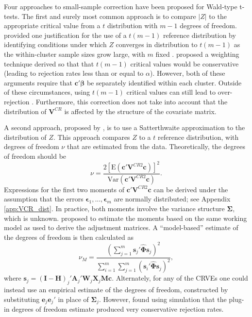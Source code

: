 \documentclass[12pt]{article}\usepackage[]{graphicx}\usepackage[]{color}
\newcommand{\E}{\text{E}}
\newcommand{\Var}{\text{Var}}
\newcommand{\bm}{\mathbf}
\newcommand{\bs}{\boldsymbol}
\begin{document}
Four approaches to small-sample correction have been proposed for Wald-type t-tests. 
The first and surely most common approach is to compare $|Z|$ to the appropriate critical value from a $t$ distribution with $m - 1$ degrees of freedom. 
\citet{Hansen2007asymptotic} provided one justification for the use of a $t(m-1)$ reference distribution by identifying conditions under which $Z$ converges in distribution to $t(m-1)$ as the within-cluster sample sizes grow large, with $m$ fixed \citep[see also][]{Donald2007inference}. 
\citet{Ibragimov2010tstatistic} proposed a weighting technique derived so that that $t(m-1)$ critical values would be conservative (leading to rejection rates less than or equal to $\alpha$).
However, both of these arguments require that $\bm{c}'\bs\beta$ be separately identified within each cluster. 
Outside of these circumstances, using $t(m-1)$ critical values can still lead to over-rejection \citep{Cameron2015practitioners}. 
Furthermore, this correction does not take into account that the distribution of $\bm{V}^{CR}$ is affected by the structure of the covariate matrix. 

A second approach, proposed by \citet{McCaffrey2001generalizations}, is to use a Satterthwaite approximation \citep{Satterthwaite1946approximate} to the distribution of $Z$.
This approach compares $Z$ to a $t$ reference distribution, with degrees of freedom $\nu$ that are estimated from the data. 
Theoretically, the degrees of freedom should be 
\begin{equation}
\label{eq:nu_Satterthwaite}
\nu = \frac{2\left[\E\left(\bm{c}'\bm{V}^{CR2}\bm{c}\right)\right]^2}{\Var\left(\bm{c}'\bm{V}^{CR2}\bm{c}\right)}.
\end{equation}
Expressions for the first two moments of $\bm{c}'\bm{V}^{CR2}\bm{c}$ can be derived under the assumption that the errors $\bs\epsilon_1,...,\bs\epsilon_m$ are normally distributed; see Appendix \ref{app:VCR_dist}. 
In practice, both moments involve the variance structure $\bs\Sigma$, which is unknown. 
\citet{McCaffrey2001generalizations} proposed to estimate the moments based on the same working model as used to derive the adjustment matrices. 
A ``model-based'' estimate of the degrees of freedom is then calculated as 
\begin{equation}
\nu_{M} = \frac{\left(\sum_{j=1}^m \bm{s}_j' \hat{\bs\Phi} \bm{s}_j\right)^2}{\sum_{i=1}^m \sum_{j=1}^m \left(\bm{s}_i' \hat{\bs\Phi} \bm{s}_j\right)^2},
\end{equation}
where $\bm{s}_j = \left(\bm{I} - \bm{H}\right)_j'\bm{A}_j'\bm{W}_j\bm{X}_j\bm{M}\bm{c}$. 
Alternately, for any of the CRVEs one could instead use an empirical estimate of the degrees of freedom, constructed by substituting $\bm{e}_j \bm{e}_j'$ in place of $\bs\Sigma_j$. 
However, \citet{Bell2002bias} found using simulation that the plug-in degrees of freedom estimate produced very conservative rejection rates. 
\end{document}
